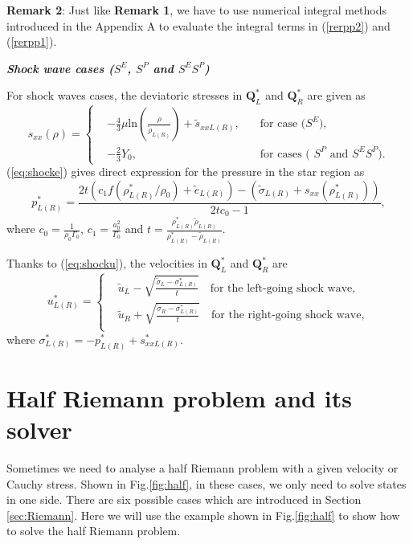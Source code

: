 \documentclass{article}
\numberwithin{equation}{section}
\numberwithin{table}{section}
\begin{document}
\textbf{Remark 2}:  Just like \textbf{Remark 1}, we have to use numerical integral methods introduced in the Appendix A to evaluate the integral terms in (\ref{rerpp2}) and (\ref{rerpp1}). %



\emph{\textbf{Shock wave cases ($S^E$, $S^P$ and $S^ES^P$)}}

For shock waves cases, the  deviatoric stresses in $\mathbf{Q}_{L}^*$  and  $\mathbf{Q}_{R}^*$ are given as
\begin{equation*}
s_{xx}(\rho) = \left\{\begin{aligned}
	  & -\frac{4}{3}\mu\text{ln}\left(\frac{\rho}{\tilde{\rho}_{L(R)}}\right)+\tilde{s}_{xxL(R)},
	\quad  &\text{for case ($S^E$)},\\
	& -\frac{2}{3}Y_0,   \quad
	&\text{for cases ( $S^P$ and $S^ES^P$)}.
  \end{aligned} \right.
  \end{equation*}
(\ref{eq:shocke}) gives direct expression for the pressure in the star region as
\begin{equation*}
  p_{L(R)}^*=
  \frac{2t\left(c_1f(\rho_{L(R)}^*/\rho_0)+\tilde{e}_{L(R)}\right)-\left(\tilde{\sigma}_{L(R)}+{s}_{xx}(\rho_{L(R)}^*)\right)}{2tc_0-1},
\end{equation*}
where $c_0 = \frac{1}{\rho_0\Gamma_0}$, $c_1 = \frac{a_0^2}{\Gamma_0}$ and $ t=\frac{\rho^*_{L(R)} \tilde{\rho}_{L(R)}}{\rho^*_{L(R)}- \tilde{\rho}_{L(R)}}$.

Thanks to (\ref{eq:shocku}), the velocities in $\mathbf{Q}_{L}^*$  and  $\mathbf{Q}_{R}^*$ are
\begin{equation*}
  u_{L(R)}^*= \left\{ \begin{aligned}
	&	\tilde{u}_L -\sqrt{\frac{\tilde{\sigma}_L-\sigma_{L(R)}^*}{t}} \quad \text{for the left-going shock wave},\\
	&  \tilde{u}_R +\sqrt{\frac{\tilde{\sigma}_R-\sigma_{L(R)}^*}{t}} \quad \text{for the right-going shock wave},\\
  \end{aligned}
\right.
\end{equation*}
where $\sigma_{L(R)}^* = -p_{L(R)}^*+s_{xxL(R)}^*$.
%
%
\section{Half Riemann problem and its solver}
Sometimes we need to analyse a half Riemann problem with a given velocity or Cauchy stress. Shown in Fig.\ref{fig:half}, in these cases, we only need to solve states in one side. There are six possible cases which are introduced in Section \ref{sec:Riemann}. Here we will use the example shown in Fig.\ref{fig:half} to show how to solve the half Riemann problem.
\end{document}
